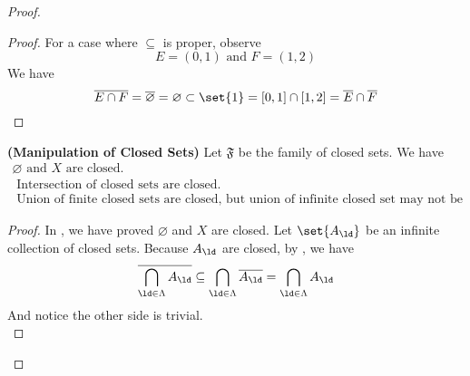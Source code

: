 \documentclass{report}
\begin{document}
\begin{proof}
\begin{proof}
For a case where $\subseteq $ is proper, observe
\begin{equation*}
E=(0,1)\text{ and }F=(1,2)
\end{equation*}
We have
\begin{equation*}
\overline{E\cap F}=\overline{\varnothing}=\varnothing \subset \set{1}=[0,1]\cap [1,2]=\overline{E}\cap \overline{F}
\end{equation*}
\end{proof}
\begin{theorem}
\label{3.2.5}
\textbf{(Manipulation of Closed Sets)} Let $\mathfrak{F}$ be the family of closed sets. We have
\begin{gather*}
\varnothing\text{ and }X\text{ are closed. }\\
\text{ Intersection of closed sets are closed. }\\
\text{ Union of finite closed sets are closed, but union of infinite closed set may not be closed. }
\end{gather*}
\end{theorem}
\begin{proof}
In , we have proved $\varnothing$ and $X$ are closed. Let $\set{A_\ld}$ be an infinite collection of closed sets. Because $A_\ld $ are closed, by , we have
\begin{equation*}
\overline{\bigcap_{\ld  \in \Lambda }A_\ld }\subseteq \bigcap _{\ld \in\Lambda }\overline{A_\ld }=\bigcap _{\ld \in\Lambda }A_\ld 
\end{equation*}
And notice the other side is trivial.\\


\end{proof}
\end{proof}
\end{document}
